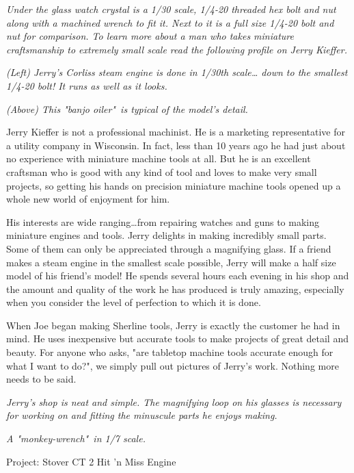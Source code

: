 
\textit{Under the glass watch crystal is a 1/30 scale, 1/4-20 threaded hex bolt
and nut along with a machined wrench to fit it. Next to it is a full size 1/4-20
bolt and nut for comparison. To learn more about a man who takes miniature
craftsmanship to extremely small scale read the following profile on Jerry
Kieffer.}

\secdown


\textit{(Left) Jerry's Corliss steam engine is done in 1/30th scale\ldots
down to the smallest 1/4-20 bolt! It runs as well as it looks.}
\bigskip

\textit{(Above) This "banjo oiler"\ is typical of the model's detail.}
\bigskip

Jerry Kieffer is not a professional machinist. He is a marketing representative
for a utility company in Wisconsin. In fact, less than 10 years ago he had just
about no experience with miniature machine tools at all. But he is an excellent
craftsman who is good with any kind of tool and loves to make very small
projects, so getting his hands on precision miniature machine tools opened up a
whole new world of enjoyment for him.

His interests are wide ranging\ldots from repairing watches and guns to making
miniature engines and tools. Jerry delights in making incredibly small parts.
Some of them can only be appreciated through a magnifying glass. If a friend
makes a steam engine in the smallest scale possible, Jerry will make a half size
model of his friend's model! He spends several hours each evening in his shop
and the amount and quality of the work he has produced is truly amazing,
especially when you consider the level of perfection to which it is done.

When Joe began making Sherline tools, Jerry is exactly the customer he had in
mind. He uses inexpensive but accurate tools to make projects of great detail
and beauty. For anyone who asks, "are tabletop machine tools accurate enough for
what I want to do?", we simply pull out pictures of Jerry's work. Nothing more
needs to be said.

\bigskip
\textit{Jerry's shop is neat and simple. The magnifying loop on his glasses is
necessary for working on and fitting the minuscule parts he enjoys making.}
\bigskip

\textit{A "monkey-wrench"\ in 1/7 scale.}
\bigskip

Project: Stover CT 2 Hit 'n Miss Engine
\bigskip

